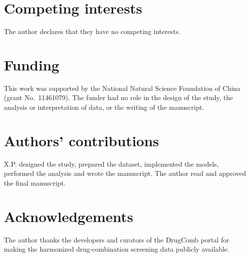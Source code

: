 \documentclass[11pt]{article}
\begin{document}
\section*{Competing interests}
The author declares that they have no competing interests.

\section*{Funding}
This work was supported by the National Natural Science Foundation of China (grant No.~11461079). The
funder had no role in the design of the study, the analysis or interpretation of data, or the writing
of the manuscript.

\section*{Authors' contributions}
X.P. designed the study, prepared the dataset, implemented the models, performed the analysis and wrote
the manuscript. The author read and approved the final manuscript.

\section*{Acknowledgements}
The author thanks the developers and curators of the DrugComb portal for making the harmonized
drug-combination screening data publicly available.
\end{document}
